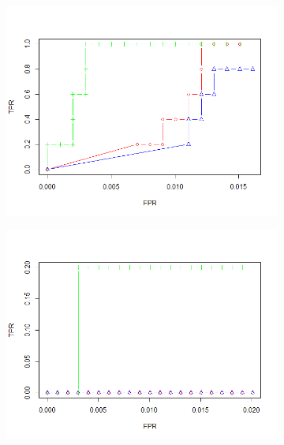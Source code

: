 \documentclass[11pt]{report}\usepackage[utf8]{inputenc}
\begin{document}
\begin{figure}[h]
\begin{subfigure}[b]{0.3\textwidth}
        \includegraphics[width=\textwidth]{../plots/200sample09}
        \caption{}
    \end{subfigure}
    \begin{subfigure}[b]{0.3\textwidth}
        \includegraphics[width=\textwidth]{../plots/200sample06}
        \caption{}
    \end{subfigure}
    \begin{subfigure}[b]{0.3\textwidth}

\end{subfigure}
\end{figure}
\end{document}
